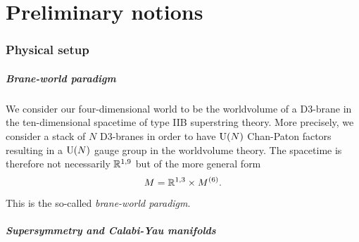 \part{Preliminary notions}


\section{Physical setup}

    \subsubsection*{Brane-world paradigm}

        We consider our four-dimensional world to be the worldvolume of a D$3$-brane in the ten-dimensional spacetime of type IIB superstring theory. More precisely, we consider a stack of $N$ D$3$-branes in order to have $\text{U}(N)$ Chan-Paton factors resulting in a $\text{U}(N)$ gauge group in the worldvolume theory. The spacetime is therefore not necessarily $\mathbb{R}^{1,9}$ but of the more general form
        \begin{equation*}
            M = \mathbb{R}^{1,3}\times M^{(6)}.\label{spacetimedecomp}
        \end{equation*}
        This is the so-called \emph{brane-world paradigm}. %

    \subsubsection*{Supersymmetry and Calabi-Yau manifolds}
    
